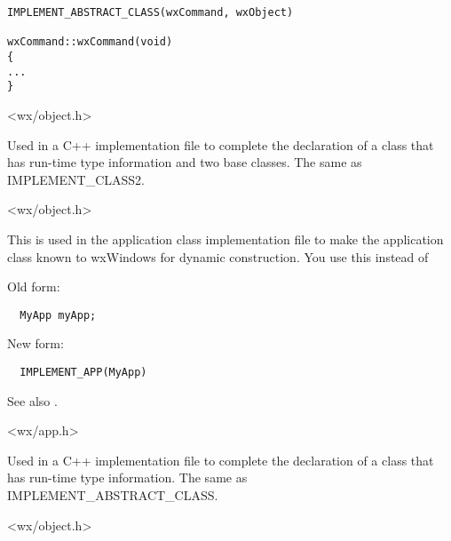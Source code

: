 \begin{verbatim}
IMPLEMENT_ABSTRACT_CLASS(wxCommand, wxObject)

wxCommand::wxCommand(void)
{
...
}
\end{verbatim}


<wx/object.h>



Used in a C++ implementation file to complete the declaration of
a class that has run-time type information and two base classes. The same as IMPLEMENT\_CLASS2.


<wx/object.h>

\label{implementapp}


This is used in the application class implementation file to make the application class known to
wxWindows for dynamic construction. You use this instead of

Old form:

\begin{verbatim}
  MyApp myApp;
\end{verbatim}

New form:

\begin{verbatim}
  IMPLEMENT_APP(MyApp)
\end{verbatim}

See also .


<wx/app.h>



Used in a C++ implementation file to complete the declaration of
a class that has run-time type information. The same as IMPLEMENT\_ABSTRACT\_CLASS.


<wx/object.h>



